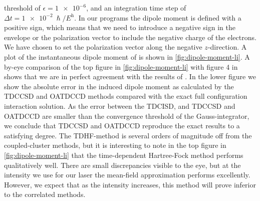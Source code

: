         threshold of $\epsilon = \num{1e-6}$, and an integration time step of
        $\Delta t = \SI{1e-2}{\hslash/\hartree}$.
        In our programs the dipole moment is defined with a positive sign,
        which means that we need to introduce a negative sign in the
        envelope or the polarization vector to include the negative charge
        of the electrons.
        We have chosen to set the polarization vector along the negative
        $z$-direction.
        A plot of the instantaneous dipole moment of  is shown in
        \autoref{fig:dipole-moment-li}.
        A by-eye comparison of the top figure in
        \autoref{fig:dipole-moment-li} with figure 4 in 
        \cite{li_2005} shows that we are in perfect agreement with the
        results of \citeauthor{li_2005}.
        In the lower figure we show the absolute error in the induced dipole
        moment as calculated by the TDCCSD and OATDCCD methods compared with
        the exact full configuration interaction solution.
        As the error between the TDCISD, and TDCCSD and OATDCCD are smaller than
        the convergence threshold of the Gauss-integrator, we conclude that
        TDCCSD and OATDCCD reproduce the exact results to a satisfying degree.
        The TDHF-method is several orders of magnitude off from the
        coupled-cluster methods, but it is interesting to note in the top figure
        in \autoref{fig:dipole-moment-li} that the time-dependent Hartree-Fock
        method performs qualitatively well.
        There are small discrepancies visible to the eye, but at the intensity
        we use for our laser the mean-field approximation performs excellently.
        However, we expect that as the intensity increases, this method will
        prove inferior to the correlated methods.

